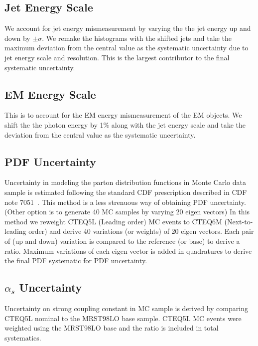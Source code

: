 \documentclass[11pt]{article}
\begin{document}
\subsection{Jet Energy Scale}
We account for jet energy mismeasurement by varying the the jet energy up and down by $\pm \sigma$. We remake the histograms with the shifted jets and take the maximum deviation from the central value as the systematic uncertainty due to jet energy scale and resolution. This is the largest contributor to the final systematic uncertainty.

\subsection{EM Energy Scale}
This is to account for the EM energy mismeasurement of the EM objects. We shift the the photon energy by 1\% along with the jet energy scale and take the deviation from the central value as the systematic uncertainty.

\subsection{PDF Uncertainty}
Uncertainty in modeling the parton distribution functions in Monte Carlo data sample is estimated following the standard CDF prescription described in CDF note 7051~\cite{CDF7051}. This method is a less strenuous way of obtaining PDF uncertainty. (Other option is to generate 40 MC samples by varying 20 eigen vectors) In this method we reweight CTEQ5L (Leading order) MC events to CTEQ6M (Next-to-leading order) and derive 40 variations (or weights) of 20 eigen vectors. Each pair of (up and down) variation is compared to the reference (or base) to derive a ratio. Maximum variations of each eigen vector is added in quadratures to derive the final PDF systematic for PDF uncertainty.

\subsection{$\alpha _{s}$ Uncertainty}
Uncertainty on strong coupling constant in MC sample is derived by comparing CTEQ5L nominal to the MRST98LO base sample. CTEQ5L MC events were weighted using the MRST98LO base and the ratio is included in total systematics.
\end{document}
